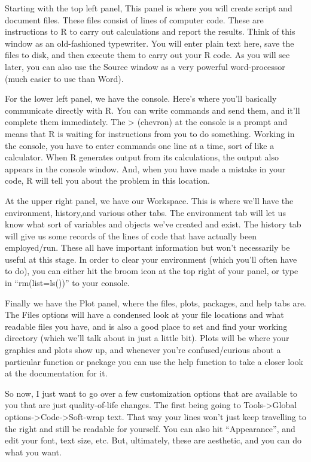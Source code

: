 \documentclass[
]{article}
\begin{document}
Starting with the top left panel, This panel is where you will create
script and document files. These files consist of lines of computer
code. These are instructions to R to carry out calculations and report
the results. Think of this window as an old-fashioned typewriter. You
will enter plain text here, save the files to disk, and then execute
them to carry out your R code. As you will see later, you can also use
the Source window as a very powerful word-processor (much easier to use
than Word).

For the lower left panel, we have the console. Here's where you'll
basically communicate directly with R. You can write commands and send
them, and it'll complete them immediately. The \textgreater{} (chevron)
at the console is a prompt and means that R is waiting for instructions
from you to do something. Working in the console, you have to enter
commands one line at a time, sort of like a calculator. When R generates
output from its calculations, the output also appears in the console
window. And, when you have made a mistake in your code, R will tell you
about the problem in this location.

At the upper right panel, we have our Workspace. This is where we'll
have the environment, history,and various other tabs. The environment
tab will let us know what sort of variables and objects we've created
and exist. The history tab will give us some records of the lines of
code that have actually been employed/run. These all have important
information but won't necessarily be useful at this stage. In order to
clear your environment (which you'll often have to do), you can either
hit the broom icon at the top right of your panel, or type in
``rm(list=ls())'' to your console.

Finally we have the Plot panel, where the files, plots, packages, and
help tabs are. The Files options will have a condensed look at your file
locations and what readable files you have, and is also a good place to
set and find your working directory (which we'll talk about in just a
little bit). Plots will be where your graphics and plots show up, and
whenever you're confused/curious about a particular function or package
you can use the help function to take a closer look at the documentation
for it.

So now, I just want to go over a few customization options that are
available to you that are just quality-of-life changes. The first being
going to Tools-\textgreater Global
options-\textgreater Code-\textgreater Soft-wrap text. That way your
lines won't just keep travelling to the right and still be readable for
yourself. You can also hit ``Appearance'', and edit your font, text
size, etc. But, ultimately, these are aesthetic, and you can do what you
want.
\end{document}
